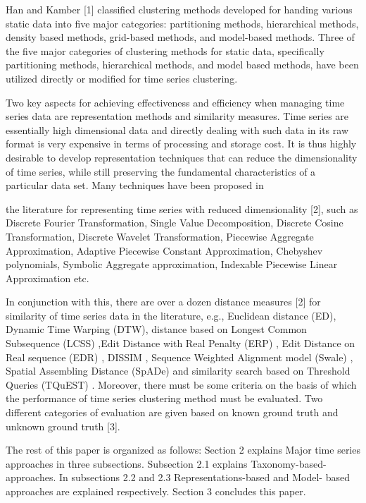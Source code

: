 Han and Kamber [1] classified clustering methods developed for handing various static data into five major categories: partitioning methods, hierarchical methods, density based methods,  grid-based  methods,  and  model-based  methods. Three of the five major categories of clustering methods for static data, specifically partitioning methods, hierarchical methods,  and  model  based  methods,  have  been  utilized directly or modified for time series clustering.

Two key aspects for achieving effectiveness and efficiency when managing time series data are representation methods and similarity measures. Time series are essentially high dimensional data and directly dealing with such data in its raw format is very expensive in terms of processing and storage cost. It is thus highly desirable to develop representation techniques that can reduce the dimensionality of time series, while still preserving the fundamental characteristics of a particular data set. Many techniques have been proposed in
 
the literature for representing time series with reduced dimensionality [2], such as Discrete Fourier Transformation, Single  Value  Decomposition,  Discrete  Cosine Transformation, Discrete Wavelet Transformation, Piecewise Aggregate Approximation, Adaptive Piecewise Constant Approximation, Chebyshev polynomials, Symbolic Aggregate approximation,  Indexable  Piecewise  Linear  Approximation etc.

In conjunction with this, there are over a dozen distance measures [2] for similarity of time series data in the literature, e.g.,   Euclidean   distance   (ED),   Dynamic   Time   Warping (DTW), distance based on Longest Common Subsequence (LCSS)  ,Edit  Distance  with  Real  Penalty  (ERP)  ,  Edit Distance on Real sequence (EDR) , DISSIM , Sequence Weighted Alignment model (Swale) , Spatial Assembling Distance (SpADe)  and similarity search based on Threshold Queries (TQuEST) . Moreover, there must be some criteria on the basis of which the performance of time series clustering method must be evaluated. Two different categories of evaluation are given based on known ground truth and unknown ground truth [3].

The rest of this paper is organized as follows: Section 2 explains Major time series approaches in three subsections. Subsection 2.1 explains Taxonomy-based-approaches. In subsections 2.2 and 2.3 Representations-based and Model- based approaches are explained respectively. Section 3 concludes this paper.

